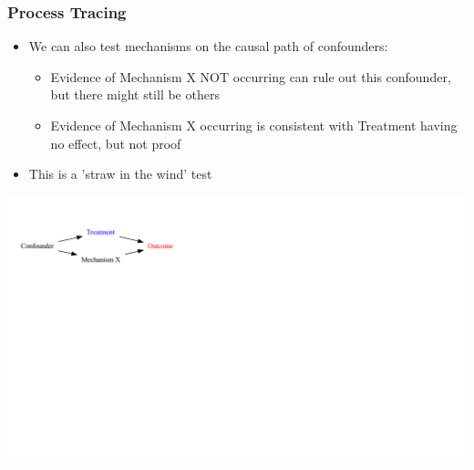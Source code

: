 \documentclass[xcolor=x11names,compress]{beamer}\usepackage[]{graphicx}\usepackage[]{color}
\newenvironment{knitrout}{}{} %
\renewcommand{\(}{\begin{columns}}
\renewcommand{\)}{\end{columns}}
\newcommand{\<}[1]{\begin{column}{#1}}
\renewcommand{\>}{\end{column}}
\begin{document}
\begin{frame}
\frametitle{Process Tracing}
\begin{itemize}
\item We can also test mechanisms on the causal path of confounders:
\pause
\begin{itemize}
\item Evidence of Mechanism X NOT occurring can rule out this confounder, but there might still be others
\pause
\item Evidence of Mechanism X occurring is consistent with Treatment having no effect, but not proof
\pause
\end{itemize}
\item This is a 'straw in the wind' test
\end{itemize}
\begin{knitrout}
\color{fgcolor}
\includegraphics[width=1.8\linewidth]{figure/Dag4-1} 

\end{knitrout}
\end{frame}
\end{document}
